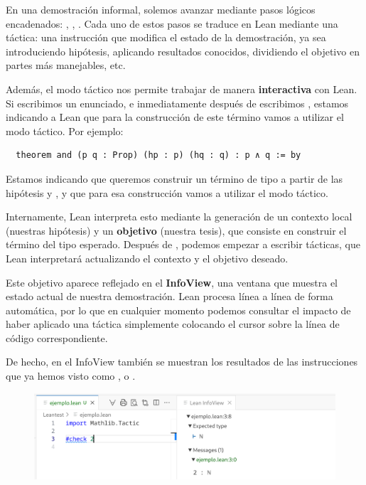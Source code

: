 En una demostración informal, solemos avanzar mediante pasos lógicos encadenados: , , . Cada uno de estos pasos se traduce en Lean mediante una táctica: una instrucción que modifica el estado de la demostración, ya sea introduciendo hipótesis, aplicando resultados conocidos, dividiendo el objetivo en partes más manejables, etc.

Además, el modo táctico nos permite trabajar de manera \textbf{interactiva} con Lean. Si escribimos un enunciado, e inmediatamente después de \code{:=} escribimos , estamos indicando a Lean que para la construcción de este término vamos a utilizar el modo táctico. Por ejemplo:

\begin{lstlisting}
  theorem and (p q : Prop) (hp : p) (hq : q) : p ∧ q := by
\end{lstlisting}

Estamos indicando que queremos construir un término de tipo  a partir de las hipótesis  y , y que para esa construcción vamos a utilizar el modo táctico.

Internamente, Lean interpreta esto mediante la generación de un contexto local (nuestras hipótesis) y un \textbf{objetivo} (nuestra tesis), que consiste en construir el término del tipo esperado. Después de , podemos empezar a escribir tácticas, que Lean interpretará actualizando el contexto y el objetivo deseado.

Este objetivo aparece reflejado en el \textbf{InfoView}, una ventana que muestra el estado actual de nuestra demostración. Lean procesa línea a línea de forma automática, por lo que en cualquier momento podemos consultar el impacto de haber aplicado una táctica simplemente colocando el cursor sobre la línea de código correspondiente.

De hecho, en el InfoView también se muestran los resultados de las instrucciones que ya hemos visto como ,  o .

\begin{figure}[h]
  \centering
  \includegraphics[width=1\textwidth]{figuras/check-example-light-version.png}
\end{figure}

